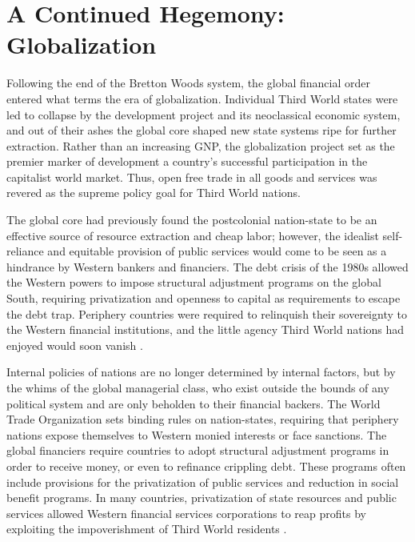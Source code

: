 \documentclass{../../../coursework}
\begin{document}
\section{A Continued Hegemony: Globalization}

Following the end of the Bretton Woods system, the global financial order
entered what \textcite{McMichael2004} terms the era of globalization.
Individual Third World states were led to collapse by the development project
and its neoclassical economic system, and out of their ashes the global core
shaped new state systems ripe for further extraction. Rather than an
increasing GNP, the globalization project set as the premier marker of
development a country's successful participation in the capitalist world
market. Thus, open free trade in all goods and services was revered as the
supreme policy goal for Third World nations.

The global core had previously found the postcolonial nation-state to be an
effective source of resource extraction and cheap labor; however, the idealist
self-reliance and equitable provision of public services would come to be seen
as a hindrance by Western bankers and financiers. The debt crisis of the 1980s
allowed the Western powers to impose structural adjustment programs on the
global South, requiring privatization and openness to capital as requirements
to escape the debt trap. Periphery countries were required to relinquish their
sovereignty to the Western financial institutions, and the little agency Third
World nations had enjoyed would soon vanish \parencite{McMichael2004}.

Internal policies of nations are no longer determined by internal factors, but
by the whims of the global managerial class, who exist outside the bounds of
any political system and are only beholden to their financial backers. The
World Trade Organization sets binding rules on nation-states, requiring that
periphery nations expose themselves to Western monied interests or face
sanctions. The global financiers require countries to adopt structural
adjustment programs in order to receive money, or even to refinance crippling
debt. These programs often include provisions for the privatization of public
services and reduction in social benefit programs. In many countries,
privatization of state resources and public services allowed Western financial
services corporations to reap profits by exploiting the impoverishment of
Third World residents \parencite{McMichael2004}.
\end{document}
